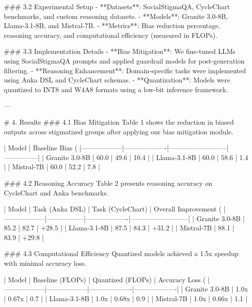 ### 3.2 Experimental Setup
- **Datasets**: SocialStigmaQA, CycleChart benchmarks, and custom reasoning datasets.
- **Models**: Granite 3.0-8B, Llama-3.1-8B, and Mistral-7B.
- **Metrics**: Bias reduction percentage, reasoning accuracy, and computational efficiency (measured in FLOPs).

### 3.3 Implementation Details
- **Bias Mitigation**: We fine-tuned LLMs using SocialStigmaQA prompts and applied guardrail models for post-generation filtering.
- **Reasoning Enhancement**: Domain-specific tasks were implemented using Anka DSL and CycleChart schemas.
- **Quantization**: Models were quantized to INT8 and W4A8 formats using a low-bit inference framework.

---

# 4. Results
### 4.1 Bias Mitigation
Table 1 shows the reduction in biased outputs across stigmatized groups after applying our bias mitigation module.

| Model           | Baseline Bias (%
|------------------|-------------------|--------------------------|---------------|
| Granite 3.0-8B  | 60.0              | 49.6                    | 10.4          |
| Llama-3.1-8B    | 60.0              | 58.6                    | 1.4           |
| Mistral-7B      | 60.0              | 52.2                    | 7.8           |

### 4.2 Reasoning Accuracy
Table 2 presents reasoning accuracy on CycleChart and Anka benchmarks.

| Model           | Task (Anka DSL) | Task (CycleChart) | Overall Improvement (%
|------------------|-----------------|-------------------|--------------------------|
| Granite 3.0-8B  | 85.2            | 82.7              | +28.5                   |
| Llama-3.1-8B    | 87.5            | 84.3              | +31.2                   |
| Mistral-7B      | 88.1            | 83.9              | +29.8                   |

### 4.3 Computational Efficiency
Quantized models achieved a 1.5x speedup with minimal accuracy loss.

| Model           | Baseline (FLOPs) | Quantized (FLOPs) | Accuracy Loss (%
|------------------|------------------|-------------------|-------------------|
| Granite 3.0-8B  | 1.0x             | 0.67x             | 0.7               |
| Llama-3.1-8B    | 1.0x             | 0.68x             | 0.9               |
| Mistral-7B      | 1.0x             | 0.66x             | 1.1               |


